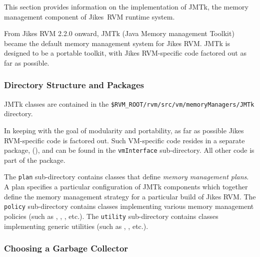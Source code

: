 
This section provides information on the implementation of JMTk, the
memory management component of Jikes\trademark\ RVM runtime system.

From Jikes RVM 2.2.0 onward, JMTk (Java Memory management
Toolkit) became the default memory management system for Jikes RVM.
JMTk is designed to be a portable toolkit, with Jikes
RVM-specific code factored out as far as possible.

\subsubsection{Directory Structure and Packages} \label{sssec:directories}

JMTk classes are contained in the
\texttt{\$RVM\_ROOT/rvm/src/vm/memoryManagers/JMTk} directory.

In keeping with the goal of modularity and portability, as far as
possible Jikes RVM-specific code is factored out.  Such VM-specific
code resides in a separate package,
(),
and can be found in the \texttt{vmInterface} sub-directory.  All other
code is part of the
package.

The \texttt{plan} sub-directory contains classes that define
\emph{memory management plans}.  A plan specifies a particular
configuration of JMTk components which together define the memory
management strategy for a particular build of Jikes RVM.  The
\texttt{policy} sub-directory contains classes implementing various
memory management policies (such as , , , etc.).  The \texttt{utility}
sub-directory contains classes implementing generic utilities (such as
,
, etc.).

\subsubsection{Choosing a Garbage Collector} \label{ssec:choosinggc}

